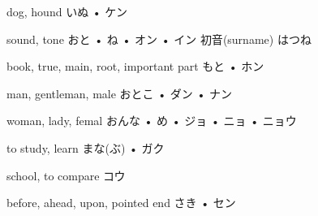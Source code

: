 



\setcounter{cardnum}{41}

		{dog, hound}
		{いぬ • ケン}
		{}{}
		{}{}
		{}{}
		{}{}
		{}{}

		{sound, tone}
		{おと • ね • オン • イン}
		{初音}{(surname) はつね}
		{}{}
		{}{}
		{}{}
		{}{}

		{book, true, main, root, important part}
		{もと • ホン}
		{}{}
		{}{}
		{}{}
		{}{}
		{}{}

		{man, gentleman, male}
		{おとこ • ダン • ナン}
		{}{}
		{}{}
		{}{}
		{}{}
		{}{}

		{woman, lady, femal}
		{おんな • め • ジョ • ニョ • ニョウ}
		{}{}
		{}{}
		{}{}
		{}{}
		{}{}

		{to study, learn}
		{まな(ぶ) • ガク}
		{}{}
		{}{}
		{}{}
		{}{}
		{}{}

		{school, to compare}
		{コウ}
		{}{}
		{}{}
		{}{}
		{}{}
		{}{}

		{before, ahead, upon, pointed end}
		{さき • セン}
		{}{}
		{}{}
		{}{}
		{}{}
		{}{}

